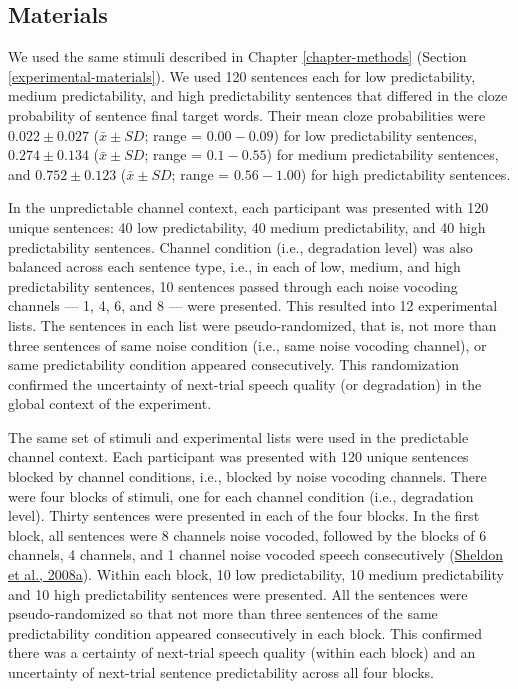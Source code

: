 \documentclass[a4paper, nobind]{templates/ociamthesis}
\begin{document}
\hypertarget{materials-1}{%
\subsection{Materials}\label{materials-1}}

We used the same stimuli described in Chapter \ref{chapter-methods} (Section \ref{experimental-materials}).
We used 120 sentences each for low predictability, medium predictability, and high predictability sentences that differed in the cloze probability of sentence final target words.
Their mean cloze probabilities were \(0.022\pm0.027\) (\(\bar{x}\pm SD\); range = \(0.00-0.09\)) for low predictability sentences, \(0.274\pm0.134\) (\(\bar{x}\pm SD\); range = \(0.1-0.55\)) for medium predictability sentences, and \(0.752\pm0.123\) (\(\bar{x}\pm SD\); range = \(0.56-1.00\)) for high predictability sentences.

In the unpredictable channel context, each participant was presented with 120 unique sentences: 40 low predictability, 40 medium predictability, and 40 high predictability sentences.
Channel condition (i.e., degradation level) was also balanced across each sentence type, i.e., in each of low, medium, and high predictability sentences, 10 sentences passed through each noise vocoding channels --- 1, 4, 6, and 8 --- were presented.
This resulted into 12 experimental lists.
The sentences in each list were pseudo-randomized, that is, not more than three sentences of same noise condition (i.e., same noise vocoding channel), or same predictability condition appeared consecutively.
This randomization confirmed the uncertainty of next-trial speech quality (or degradation) in the global context of the experiment.

The same set of stimuli and experimental lists were used in the predictable channel context.
Each participant was presented with 120 unique sentences blocked by channel conditions, i.e., blocked by noise vocoding channels.
There were four blocks of stimuli, one for each channel condition (i.e., degradation level).
Thirty sentences were presented in each of the four blocks.
In the first block, all sentences were 8 channels noise vocoded, followed by the blocks of 6 channels, 4 channels, and 1 channel noise vocoded speech consecutively (\protect\hyperlink{ref-Sheldon2008a}{Sheldon et al., 2008a}).
Within each block, 10 low predictability, 10 medium predictability and 10 high predictability sentences were presented.
All the sentences were pseudo-randomized so that not more than three sentences of the same predictability condition appeared consecutively in each block.
This confirmed there was a certainty of next-trial speech quality (within each block) and an uncertainty of next-trial sentence predictability across all four blocks.
\end{document}
